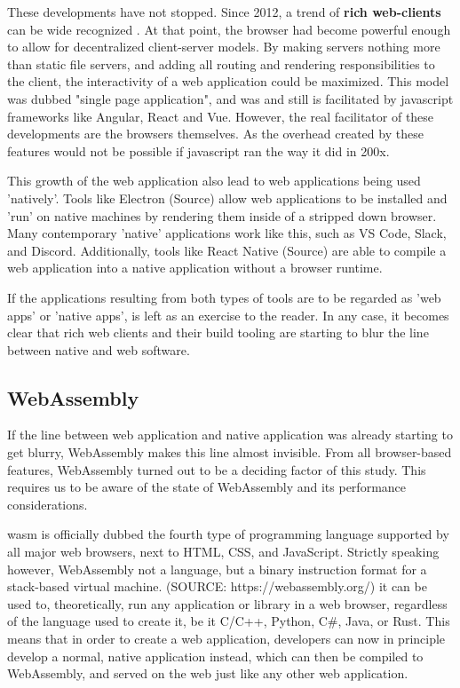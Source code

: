 These developments have not stopped. Since 2012, a trend of \textbf{rich web-clients} can be wide recognized \cite{hamilton_client-side_2014, panidi_hybrid_2015, kulawiak_analysis_2019}.
At that point, the browser had become powerful enough to allow for decentralized client-server models.
By making servers nothing more than static file servers, and adding all routing and rendering responsibilities to the client, the interactivity of a web application could be maximized. 
This model was dubbed "single page application", and was and still is facilitated by javascript frameworks like Angular, React and Vue.
However, the real facilitator of these developments are the browsers themselves.
As the overhead created by these features would not be possible if javascript ran the way it did in 200x. 

This growth of the web application also lead to web applications being used 'natively'. 
Tools like Electron (Source) allow web applications to be installed and 'run' on native machines by rendering them inside of a stripped down browser. 
Many contemporary 'native' applications work like this, such as VS Code, Slack, and Discord.
Additionally, tools like React Native (Source) are able to compile a web application into a native application without a browser runtime.  

If the applications resulting from both types of tools are to be regarded as 'web apps' or 'native apps', is left as an exercise to the reader. 
In any case, it becomes clear that rich web clients and their build tooling are starting to blur the line between native and web software.

\subsection{WebAssembly}
\label{sec:background-wasm}

If the line between web application and native application was already starting to get blurry, WebAssembly makes this line almost invisible. 
From all browser-based features, WebAssembly turned out to be a deciding factor of this study. This requires us to be aware of the state of WebAssembly and its performance considerations.

\ac{wasm} is officially dubbed the fourth type of programming language supported by all major web browsers, next to HTML, CSS, and JavaScript.
Strictly speaking however, WebAssembly not a language, but a binary instruction format for a stack-based virtual machine.
(SOURCE: https://webassembly.org/)
it can be used to, theoretically, run any application or library in a web browser, regardless of the language used to create it, be it C/C++, Python, C\#, Java, or Rust. 
This means that in order to create a web application, developers can now in principle develop a normal, native application instead, which can then be compiled to WebAssembly, and served on the web just like any other web application. 

